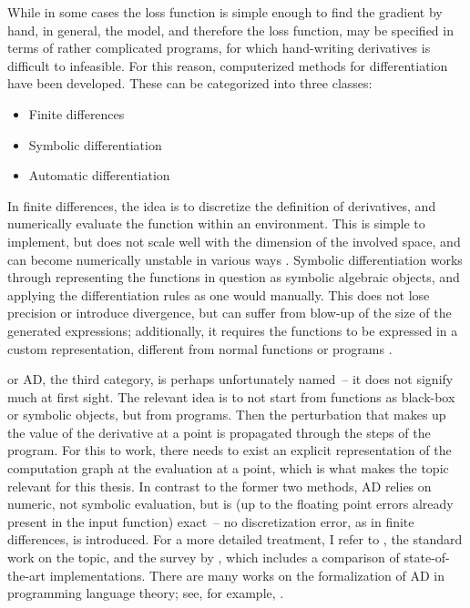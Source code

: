 While in some cases the loss function is simple enough to find the gradient by hand, in general, the
model, and therefore the loss function, may be specified in terms of rather complicated programs,
for which hand-writing derivatives is difficult to infeasible.  For this reason, computerized
methods for differentiation have been developed.  These can be categorized into three classes:
\begin{itemize}
  \firmlist
\item Finite differences
\item Symbolic differentiation
\item Automatic differentiation
\end{itemize}
In finite differences, the idea is to discretize the definition of derivatives, and numerically
evaluate the function within an environment.  This is simple to implement, but does not scale well
with the dimension of the involved space, and can become numerically unstable in various ways
\parencite[section 5.7]{press2007numerical}.  Symbolic differentiation works through representing
the functions in question as symbolic algebraic objects, and applying the differentiation rules as
one would manually.  This does not lose precision or introduce divergence, but can suffer from
blow-up of the size of the generated expressions; additionally, it requires the functions to be
expressed in a custom representation, different from normal functions or programs
\parencite{baydin2018automatic}.

 or AD, the third category, is perhaps unfortunately named~--
it does not signify much at first sight.  The relevant idea is to not start from functions as
black-box or symbolic objects, but from programs.  Then the perturbation that makes up the value of
the derivative at a point is propagated through the steps of the program.  For this to work, there
needs to exist an explicit representation of the computation graph at the evaluation at a point,
which is what makes the topic relevant for this thesis.  In contrast to the former two methods, AD
relies on numeric, not symbolic evaluation, but is (up to the floating point errors already present
in the input function) exact~-- no discretization error, as in finite differences, is introduced.
For a more detailed treatment, I refer to \textcite{griewank2008evaluating}, the standard work on
the topic, and the survey by \textcite{baydin2018automatic}, which includes a comparison of
state-of-the-art implementations.  There are many works on the formalization of AD in programming
language theory; see, for example, \textcite{abadi2020simple}.

